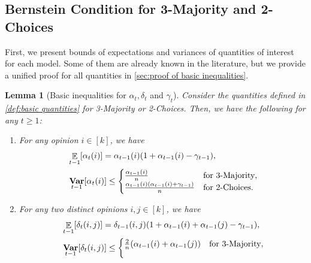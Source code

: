 \documentclass[letterpaper,11pt]{article}
\newtheorem{lemma}[theorem]{Lemma}
\DeclareMathOperator*{\E}{\mathbb{E}}
\DeclareMathOperator*{\Var}{\mathbf{Var}}
\newcommand{\alphanorm}{\gamma}
\begin{document}
\subsection{Bernstein Condition for 3-Majority and 2-Choices} \label{sec:bernstein condition for sync processes}
First, we present bounds of expectations and variances of quantities of interest for each model.
Some of them are already known in the literature, but we provide a unified proof for all quantities in \cref{sec:proof of basic inequalities}.
\begin{lemma}[Basic inequalities for $\alpha_t, \delta_t$ and $\alphanorm_t$]\label{lem:basic inequality}
  Consider the quantities defined in \cref{def:basic quantities} for 3-Majority or 2-Choices.
  Then, we have the following for any $t\geq 1$:
\begin{enumerate}
            \renewcommand{\labelenumi}{(\roman{enumi})}
\item \label{item:alpha} 
For any opinion $i \in [k]$, we have
  \begin{align*} 
     &\E_{t-1} [\alpha_t(i)] = 
      \alpha_{t-1}(i) \qty( 1 + \alpha_{t-1}(i) - \alphanorm_{t-1} ), \\ %
    &\Var_{t-1}[\alpha_t(i)] \le \begin{cases}
      \frac{\alpha_{t-1}(i)}{n}	& \text{for 3-Majority},\\
      \frac{\alpha_{t-1}(i)(\alpha_{t-1}(i) + \alphanorm_{t-1})}{n}	& \text{for 2-Choices}.
    \end{cases} %
  \end{align*}
\item \label{item:delta} 
For any two distinct opinions $i,j\in [k]$, we have
  \begin{align*} 
     &\E_{t-1} [\delta_t(i,j)] =
      \delta_{t-1}(i,j) \qty( 1 + \alpha_{t-1}(i) + \alpha_{t-1}(j) - \alphanorm_{t-1} ), \\
    &\Var_{t-1}[\delta_t(i,j)] \le \begin{cases}
      \frac{2}{n}(\alpha_{t-1}(i) + \alpha_{t-1}(j))	& \text{for 3-Majority},\\[10pt]

\end{cases}
\end{align*}
\end{enumerate}
\end{lemma}
\end{document}
